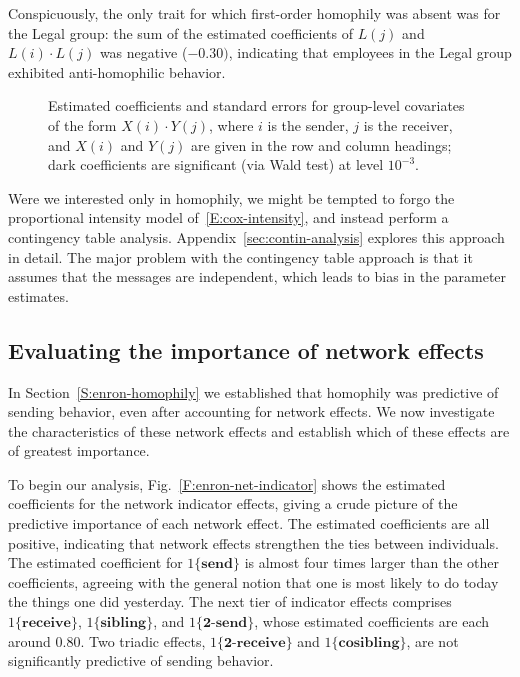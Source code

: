 \documentclass[final]{statsoc}
\begin{document}
Conspicuously, the only trait for which first-order homophily was
absent was for the Legal group: the sum of the estimated coefficients of
$L(j)$ and $L(i) \cdot L(j)$ was negative ($-0.30)$, indicating that
employees in the Legal group exhibited anti-homophilic behavior.

\begin{figure}
  \centering
  \makebox[\textwidth]{
    \scriptsize
    
  }
  \caption{
    Estimated coefficients and standard errors for group-level covariates
    of the form $X(i) \cdot Y(j)$, where $i$ is the sender, $j$ is the
    receiver, and $X(i)$ and $Y(j)$ are given in the row and column
    headings; dark coefficients are significant (via Wald test) at
    level $10^{-3}$.
  }
  \label{T:group-dynamic}
\end{figure}

Were we interested only in homophily, we might be tempted to forgo
the proportional intensity model of~\eqref{E:cox-intensity}, and instead
perform a contingency table analysis.  Appendix~\ref{sec:contin-analysis}
explores this approach in detail.  The major problem with the contingency
table approach is that it assumes that the messages are independent, which
leads to bias in the parameter estimates.

\subsection{Evaluating the importance of network effects}
\label{S:enron-network}

In Section~\ref{S:enron-homophily} we established that homophily was
predictive of sending behavior, even after accounting for network effects.  We
now investigate the characteristics of these network effects and
establish which of these effects are of greatest importance.

To begin our analysis, Fig.~\ref{F:enron-net-indicator} shows the estimated coefficients for the
network indicator effects, giving a crude picture of the predictive importance
of each network effect.  The estimated coefficients are all positive,
indicating that network effects strengthen the ties between individuals.  The
estimated coefficient for $1\{\textbf{send}\}$ is almost four times larger
than the other coefficients, agreeing with the general notion that one is most likely
to do today the things one did yesterday.  The next tier of indicator effects
comprises $1\{\textbf{receive}\}$, $1\{\textbf{sibling}\}$, and
$1\{\textbf{2-send}\}$, whose estimated coefficients are each around $0.80$.
Two triadic effects, $1\{\textbf{2-receive}\}$ and
$1\{\textbf{cosibling}\}$, are not significantly predictive of sending behavior.
\end{document}
